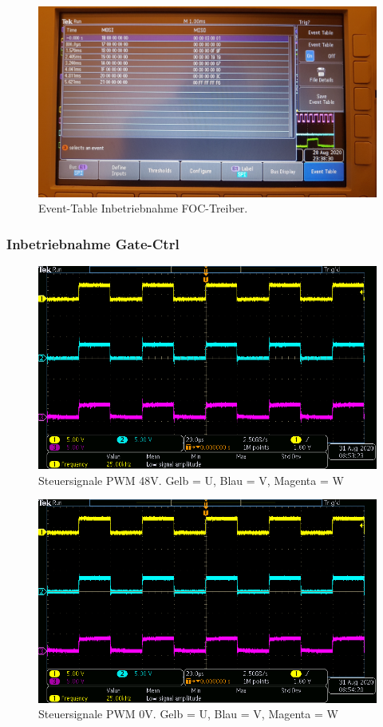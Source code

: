 \begin{figure}[H]
\center
\includegraphics[width = \textwidth]{graphics/TMC4671_TimeTable_Lesen_Bild}
\caption{Event-Table Inbetriebnahme FOC-Treiber.}
\label{fig:TMC4671_TimeTable_Lesen_Bild}
\end{figure}

\newpage

\subsubsection{Inbetriebnahme Gate-Ctrl}\label{Appendix:TMC4671_Gate_Ctrl}

\begin{figure}[H]
\center
\includegraphics[width = \textwidth]{graphics/TMC4671_Gate_Signal_H}
\caption{Steuersignale PWM 48V. Gelb = U, Blau = V, Magenta = W}
\label{fig:TMC4671_Gate_Signal_H}
\end{figure}

\begin{figure}[H]
\center
\includegraphics[width = \textwidth]{graphics/TMC4671_Gate_Signal_L}
\caption{Steuersignale PWM 0V. Gelb = U, Blau = V, Magenta = W}
\label{fig:TMC4671_Gate_Signal_L}
\end{figure}